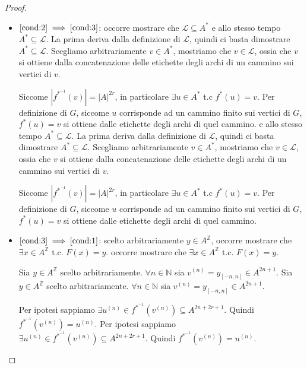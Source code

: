\begin{teorema}
\begin{proof}
\begin{itemize}
            \item $\ref{cond:2}\implies \ref{cond:3}$: occorre mostrare che $\mathcal{L} \subseteq A^\ast$
                  e allo stesso tempo $ A^\ast \subseteq\mathcal{L}$. La prima deriva
                  dalla definizione di $\mathcal{L}$, quindi ci basta dimostrare
                  $A^\ast \subseteq\mathcal{L}$. Scegliamo arbitrariamente $v\in  A^\ast$,
                  mostriamo che $v\in \mathcal{L}$, ossia che $v$ si ottiene dalla concatenazione
                  delle etichette degli archi di un cammino sui vertici di $v$.

                  Siccome $|f^{\ast^{-1}}(v)| = |A|^{2r}$, in particolare $\exists u \in A^\ast$
                  t.c $f^\ast(u) = v$. Per definizione di $G$, siccome $u$ corrisponde
                  ad un cammino finito sui vertici di $G$, $f^\ast(u)=v$ si ottiene dalle etichette
                  degli archi di quel cammino.
                  e allo stesso tempo $ A^\ast \subseteq\mathcal{L}$. La prima deriva
                  dalla definizione di $\mathcal{L}$, quindi ci basta dimostrare
                  $A^\ast \subseteq\mathcal{L}$. Scegliamo arbitrariamente $v\in  A^\ast$,
                  mostriamo che $v\in \mathcal{L}$, ossia che $v$ si ottiene dalla concatenazione
                  delle etichette degli archi di un cammino sui vertici di $v$.

                  Siccome $|f^{\ast^{-1}}(v)| = |A|^{2r}$, in particolare $\exists u \in A^\ast$
                  t.c $f^\ast(u) = v$. Per definizione di $G$, siccome $u$ corrisponde
                  ad un cammino finito sui vertici di $G$, $f^\ast(u)=v$ si ottiene dalle etichette
                  degli archi di quel cammino.
            \item $\ref{cond:3}\implies \ref{cond:1}$: scelto arbitrariamente $y\in A^\mathbb{Z}$,
                  occorre mostrare che $\exists x\in A^\mathbb{Z} \text{ t.c. } F(x) =y$.
                  occorre mostrare che $\exists x\in A^\mathbb{Z} \text{ t.c. } F(x) =y$.

                  Sia $y\in A^\mathbb{Z}$ scelto arbitrariamente. $\forall n\in \mathbb{N}$
                  sia $v^{(n)} = y_{[-n,n]}\in A^{2n+1}$.
                  Sia $y\in A^\mathbb{Z}$ scelto arbitrariamente. $\forall n\in \mathbb{N}$
                  sia $v^{(n)} = y_{[-n,n]}\in A^{2n+1}$.

                  Per ipotesi sappiamo $\exists u^{(n)}\in f^{\ast^{-1}}(v^{(n)})\subseteq A^{2n+2r+1}$.
                  Quindi $f^{\ast^{-1}}(v^{(n)}) = u^{(n)}$.
                  Per ipotesi sappiamo $\exists u^{(n)}\in f^{\ast^{-1}}(v^{(n)})\subseteq A^{2n+2r+1}$.
                  Quindi $f^{\ast^{-1}}(v^{(n)}) = u^{(n)}$.


\end{itemize}
\end{proof}
\end{teorema}
